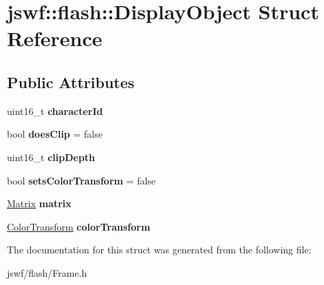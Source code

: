 \hypertarget{structjswf_1_1flash_1_1_display_object}{\section{jswf\+:\+:flash\+:\+:Display\+Object Struct Reference}
\label{structjswf_1_1flash_1_1_display_object}
}
\subsection*{Public Attributes}
\begin{DoxyCompactItemize}
\item 
\hypertarget{structjswf_1_1flash_1_1_display_object_a27d064aef1dd8ada08b5e4971d6c93c6}{uint16\+\_\+t {\bfseries character\+Id}}\label{structjswf_1_1flash_1_1_display_object_a27d064aef1dd8ada08b5e4971d6c93c6}

\item 
\hypertarget{structjswf_1_1flash_1_1_display_object_ae24c670225899100f41a8ed1a2cc5644}{bool {\bfseries does\+Clip} = false}\label{structjswf_1_1flash_1_1_display_object_ae24c670225899100f41a8ed1a2cc5644}

\item 
\hypertarget{structjswf_1_1flash_1_1_display_object_ad1f9183db6ccfa738fe5912dd60cce42}{uint16\+\_\+t {\bfseries clip\+Depth}}\label{structjswf_1_1flash_1_1_display_object_ad1f9183db6ccfa738fe5912dd60cce42}

\item 
\hypertarget{structjswf_1_1flash_1_1_display_object_a234a3ae1496dd2afb4a452c79a4a6e93}{bool {\bfseries sets\+Color\+Transform} = false}\label{structjswf_1_1flash_1_1_display_object_a234a3ae1496dd2afb4a452c79a4a6e93}

\item 
\hypertarget{structjswf_1_1flash_1_1_display_object_aa96b9a343b3224332c885c44a8fd6e39}{\hyperlink{structjswf_1_1flash_1_1_matrix}{Matrix} {\bfseries matrix}}\label{structjswf_1_1flash_1_1_display_object_aa96b9a343b3224332c885c44a8fd6e39}

\item 
\hypertarget{structjswf_1_1flash_1_1_display_object_a586bd37f01802ac031ad72e8ef095815}{\hyperlink{structjswf_1_1flash_1_1_color_transform}{Color\+Transform} {\bfseries color\+Transform}}\label{structjswf_1_1flash_1_1_display_object_a586bd37f01802ac031ad72e8ef095815}

\end{DoxyCompactItemize}


The documentation for this struct was generated from the following file\+:\begin{DoxyCompactItemize}
\item 
jswf/flash/Frame.\+h\end{DoxyCompactItemize}
